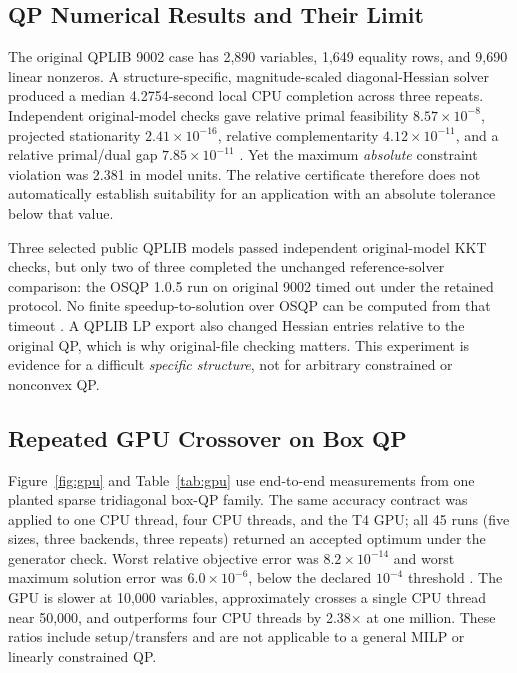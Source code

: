 \documentclass[10pt,a4paper,twocolumn]{article}
\begin{document}
\subsection{QP Numerical Results and Their Limit}

The original QPLIB 9002 case has 2,890 variables, 1,649 equality rows, and 9,690 linear nonzeros. A structure-specific, magnitude-scaled diagonal-Hessian solver produced a median 4.2754-second local CPU completion across three repeats. Independent original-model checks gave relative primal feasibility $8.57\times10^{-8}$, projected stationarity $2.41\times10^{-16}$, relative complementarity $4.12\times10^{-11}$, and a relative primal/dual gap $7.85\times10^{-11}$ \cite{qp9002}. Yet the maximum \emph{absolute} constraint violation was 2.381 in model units. The relative certificate therefore does not automatically establish suitability for an application with an absolute tolerance below that value.

Three selected public QPLIB models passed independent original-model KKT checks, but only two of three completed the unchanged reference-solver comparison: the OSQP 1.0.5 run on original 9002 timed out under the retained protocol. No finite speedup-to-solution over OSQP can be computed from that timeout \cite{qp9002}. A QPLIB LP export also changed Hessian entries relative to the original QP, which is why original-file checking matters. This experiment is evidence for a difficult \emph{specific structure}, not for arbitrary constrained or nonconvex QP.

\subsection{Repeated GPU Crossover on Box QP}

Figure~\ref{fig:gpu} and Table~\ref{tab:gpu} use end-to-end measurements from one planted sparse tridiagonal box-QP family. The same accuracy contract was applied to one CPU thread, four CPU threads, and the T4 GPU; all 45 runs (five sizes, three backends, three repeats) returned an accepted optimum under the generator check. Worst relative objective error was $8.2\times10^{-14}$ and worst maximum solution error was $6.0\times10^{-6}$, below the declared $10^{-4}$ threshold \cite{gpu03}. The GPU is slower at 10,000 variables, approximately crosses a single CPU thread near 50,000, and outperforms four CPU threads by 2.38$\times$ at one million. These ratios include setup/transfers and are not applicable to a general MILP or linearly constrained QP.
\end{document}
